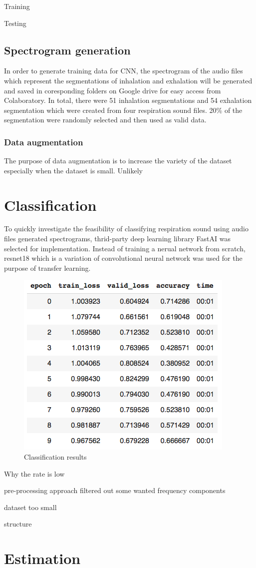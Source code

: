 Training 

Testing
\subsection{Spectrogram generation}
In order to generate training data for CNN, the spectrogram of the audio files which represent the segmentations of inhalation and exhalation will be generated and saved in coresponding folders on Google drive for easy access from Colaboratory. In total, there were 51 inhalation segmentations and 54 exhalation segmentation which were created from four respiration sound files. 20\% of the segmentation were randomly selected and then used as valid data.

\subsubsection{Data augmentation}
The purpose of data augmentation is to increase the variety of the dataset especially when the dataset is small. Unlikely 

\section{Classification}
To quickly investigate the feasibility of classifying respiration sound using audio files generated spectrograms, thrid-party deep learning library FastAI was selected for implementation. Instead of training a nerual network from scratch, resnet18 which is a variation of convolutional neural network was used for the purpose of transfer learning. 

\begin{figure}[h]
    \centering
    \includegraphics[scale=0.6]{figures/classification_results.png}
    \caption{Classification results}
    \label{fig:classification_results}
\end{figure}

Why the rate is low

pre-processing approach filtered out some wanted frequency components

dataset too small

structure

\section{Estimation}


